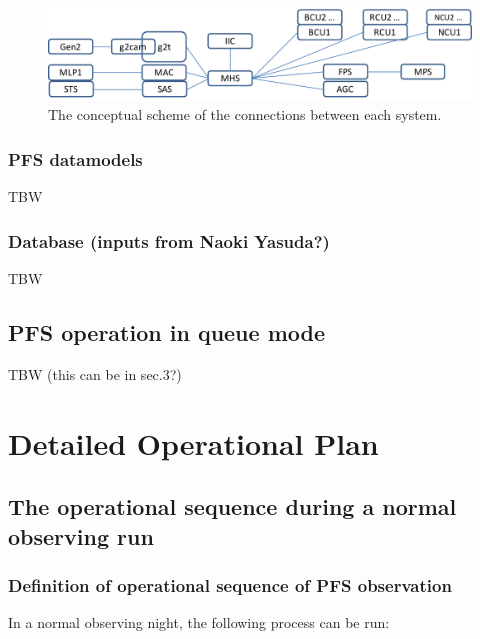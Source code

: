 \documentclass[a4paper]{article}
\begin{document}
\begin{figure}[!htb]
\begin{center}
\includegraphics[scale=0.5]{./figures/software_connections.pdf}
\end{center}
\caption{The conceptual scheme of the connections between each system.\label{fig:pfs_software_connections}}
\end{figure}

\subsubsection{PFS datamodels\label{sec:survey_operation:datamodels}}
TBW

\subsubsection{Database (inputs from Naoki Yasuda?)\label{sec:survey_operation:database}}
TBW

\subsection{PFS operation in queue mode}
TBW (this can be in sec.3?)



\section{Detailed Operational Plan\label{sec:detail_ope_plan}}
\subsection{The operational sequence during a normal observing run \label{sec:detail_ope_plan:sequence}}

\subsubsection{Definition of operational sequence of PFS observation \label{sec:detail_ope_plan:definition}}
In a normal observing night, the following process can be run:
\end{document}
